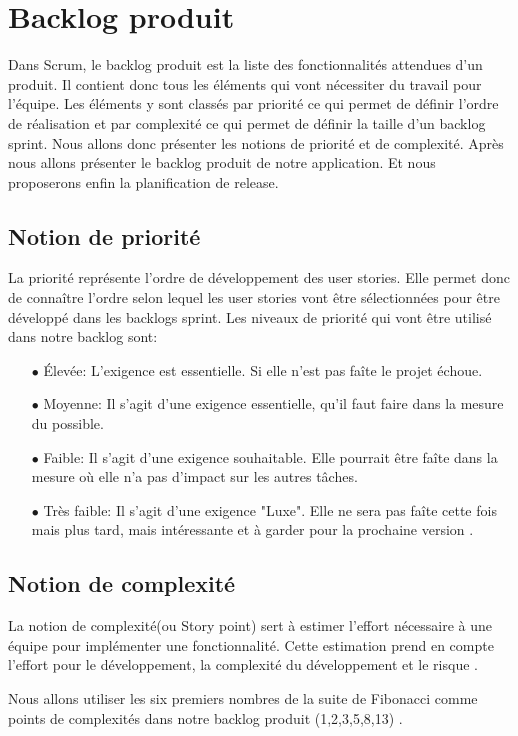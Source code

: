 \section{Backlog produit}
Dans Scrum, le backlog produit est la liste des fonctionnalités attendues d'un produit. Il contient donc tous les éléments qui vont nécessiter du travail pour l'équipe. Les éléments y sont classés par priorité ce qui permet de définir l'ordre de réalisation et par complexité ce qui permet de définir la taille d'un backlog sprint.
Nous allons donc présenter les notions de priorité et de complexité. Après nous allons présenter le backlog produit de notre application. Et nous proposerons enfin la planification de release.
\subsection{Notion de priorité}
La priorité représente l'ordre de développement des user stories. Elle permet donc de connaître l'ordre selon lequel les user stories vont être sélectionnées pour être développé dans les backlogs sprint.
Les niveaux de priorité qui vont être utilisé dans notre backlog sont:
\begin{itemize}
	\item[$\bullet$] Élevée: L’exigence est essentielle. Si elle n’est pas faîte le projet échoue.
	\item[$\bullet$] Moyenne: Il s’agit d’une exigence essentielle, qu’il faut faire dans la mesure du possible.
    \item[$\bullet$] Faible: Il s’agit d’une exigence souhaitable. Elle pourrait être faîte dans la mesure où elle n’a pas d’impact sur les autres tâches.
   	\item[$\bullet$] Très faible: Il s’agit d’une exigence "Luxe". Elle ne sera pas faîte cette fois mais plus tard, mais intéressante et à garder pour la prochaine version \cite{Backlog}.
\end{itemize}
\subsection{Notion de complexité}
La notion de complexité(ou Story point) sert à estimer l’effort nécessaire à une équipe pour implémenter une fonctionnalité.
Cette estimation prend en compte l'effort pour le développement, la complexité du développement et le risque \cite{ComplexiteScrum}.

Nous allons utiliser les six premiers nombres de la suite de Fibonacci comme points de complexités dans notre backlog produit (1,2,3,5,8,13) \cite{SuiteFibo}.
